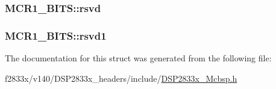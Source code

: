 \subsubsection[{rsvd}]{ M\+C\+R1\+\_\+\+B\+I\+T\+S\+::rsvd}\label{struct_m_c_r1___b_i_t_s_aed1b51460a5f1e89a312c59fd51d581c}
\hypertarget{struct_m_c_r1___b_i_t_s_a794adfb0e561f35d1e0488670ee61f97}{}
\subsubsection[{rsvd1}]{ M\+C\+R1\+\_\+\+B\+I\+T\+S\+::rsvd1}\label{struct_m_c_r1___b_i_t_s_a794adfb0e561f35d1e0488670ee61f97}


The documentation for this struct was generated from the following file\+:\begin{DoxyCompactItemize}
\item 
f2833x/v140/\+D\+S\+P2833x\+\_\+headers/include/\hyperlink{_d_s_p2833x___mcbsp_8h}{D\+S\+P2833x\+\_\+\+Mcbsp.\+h}\end{DoxyCompactItemize}
